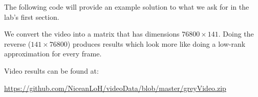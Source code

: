 The following code will provide an example solution to what we ask for in the lab's first section.


We convert the video into a matrix that has dimensions $76800 \times 141$. Doing the reverse ($141 \times 76800$) produces results which look more like doing a low-rank approximation for every frame.

Video results can be found at:

\url{https://github.com/NiceanLoH/videoData/blob/master/greyVideo.zip}